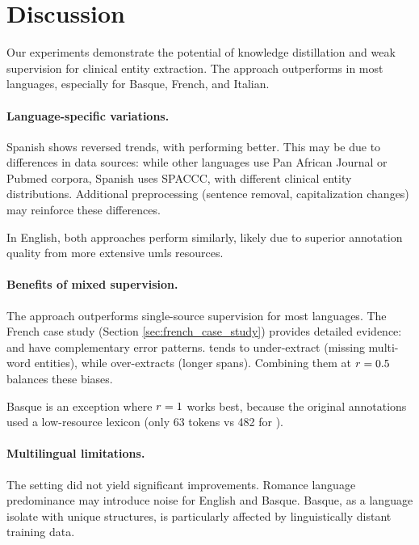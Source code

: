 
\section{Discussion}

Our experiments demonstrate the potential of knowledge distillation and weak supervision for clinical entity extraction. The \distilmodels approach outperforms \weakModel in most languages, especially for Basque, French, and Italian.

\paragraph{Language-specific variations.} Spanish shows reversed trends, with \weakModel performing better. This may be due to differences in data sources: while other languages use Pan African Journal or Pubmed corpora, Spanish uses SPACCC, with different clinical entity distributions. Additional preprocessing (sentence removal, capitalization changes) may reinforce these differences.

In English, both approaches perform similarly, likely due to superior \dict annotation quality from more extensive \gls{umls} resources.

\paragraph{Benefits of mixed supervision.} The \hybridmodel approach outperforms single-source supervision for most languages. The French case study (Section \ref{sec:french_case_study}) provides detailed evidence: \dict and \instruct have complementary error patterns. \dict tends to under-extract (missing multi-word entities), while \instruct over-extracts (longer spans). Combining them at $r=0.5$ balances these biases.

Basque is an exception where $r=1$ works best, because the original \dict annotations used a low-resource lexicon (only 63 \iclin tokens vs 482 for \instruct).

\paragraph{Multilingual limitations.} The \multi setting did not yield significant improvements. Romance language predominance may introduce noise for English and Basque. Basque, as a language isolate with unique structures, is particularly affected by linguistically distant training data.

